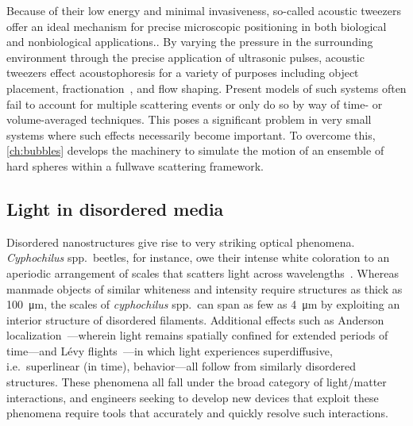 Because of their low energy and minimal invasiveness, so-called acoustic tweezers offer an ideal mechanism for precise microscopic positioning in both biological and nonbiological applications..
By varying the pressure in the surrounding environment through the precise application of ultrasonic pulses, acoustic tweezers effect acoustophoresis for a variety of purposes including object placement, fractionation~\cite{Petersson2007}, and flow shaping.
Present models of such systems often fail to account for multiple scattering events or only do so by way of time- or volume-averaged techniques.
This poses a significant problem in very small systems where such effects necessarily become important.
To overcome this, \cref{ch:bubbles} develops the machinery to simulate the motion of an ensemble of hard spheres within a fullwave scattering framework.

\subsection{Light in disordered media}

Disordered nanostructures give rise to very striking optical phenomena.
\emph{Cyphochilus} spp.\ beetles, for instance, owe their intense white coloration to an aperiodic arrangement of scales that scatters light across wavelengths~\cite{Vukusic2007}.
Whereas manmade objects of similar whiteness and intensity require structures as thick as \SI{100}{\micro\meter}, the scales of \emph{cyphochilus} spp.\ can span as few as \SI{4}{\micro\meter} by exploiting an interior structure of disordered filaments. 
Additional effects such as Anderson localization~\cite{Anderson1985}---wherein light remains spatially confined for extended periods of time---and L\'evy flights~\cite{Barthelemy2008}---in which light experiences superdiffusive, i.e.\ superlinear (in time), behavior---all follow from similarly disordered structures.
These phenomena all fall under the broad category of light/matter interactions, and engineers seeking to develop new devices that exploit these phenomena require tools that accurately and quickly resolve such interactions. 

